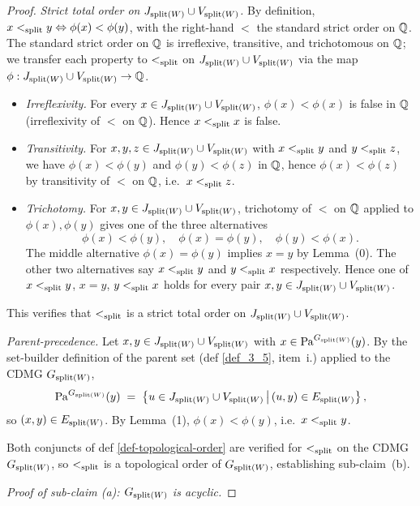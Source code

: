 \documentclass[main]{subfiles}
\begin{document}
\begin{proof}
\emph{Strict total order on $J_{\mathrm{split}(W)} \cup V_{\mathrm{split}(W)}$.} By definition, $x <_{\mathrm{split}} y \Leftrightarrow \phi(x) < \phi(y)$, with the right-hand $<$ the standard strict order on $\mathbb{Q}$. The standard strict order on $\mathbb{Q}$ is irreflexive, transitive, and trichotomous on $\mathbb{Q}$; we transfer each property to $<_{\mathrm{split}}$ on $J_{\mathrm{split}(W)} \cup V_{\mathrm{split}(W)}$ via the map $\phi : J_{\mathrm{split}(W)} \cup V_{\mathrm{split}(W)} \to \mathbb{Q}$.
\begin{itemize}
    \item \emph{Irreflexivity.} For every $x \in J_{\mathrm{split}(W)} \cup V_{\mathrm{split}(W)}$, $\phi(x) < \phi(x)$ is false in $\mathbb{Q}$ (irreflexivity of $<$ on $\mathbb{Q}$). Hence $x <_{\mathrm{split}} x$ is false.
    \item \emph{Transitivity.} For $x, y, z \in J_{\mathrm{split}(W)} \cup V_{\mathrm{split}(W)}$ with $x <_{\mathrm{split}} y$ and $y <_{\mathrm{split}} z$, we have $\phi(x) < \phi(y)$ and $\phi(y) < \phi(z)$ in $\mathbb{Q}$, hence $\phi(x) < \phi(z)$ by transitivity of $<$ on $\mathbb{Q}$, i.e.\ $x <_{\mathrm{split}} z$.
    \item \emph{Trichotomy.} For $x, y \in J_{\mathrm{split}(W)} \cup V_{\mathrm{split}(W)}$, trichotomy of $<$ on $\mathbb{Q}$ applied to $\phi(x), \phi(y)$ gives one of the three alternatives
        \[
            \phi(x) < \phi(y), \quad \phi(x) = \phi(y), \quad \phi(y) < \phi(x).
        \]
        The middle alternative $\phi(x) = \phi(y)$ implies $x = y$ by Lemma~(0). The other two alternatives say $x <_{\mathrm{split}} y$ and $y <_{\mathrm{split}} x$ respectively. Hence one of $x <_{\mathrm{split}} y$, $x = y$, $y <_{\mathrm{split}} x$ holds for every pair $x, y \in J_{\mathrm{split}(W)} \cup V_{\mathrm{split}(W)}$.
\end{itemize}
This verifies that $<_{\mathrm{split}}$ is a strict total order on $J_{\mathrm{split}(W)} \cup V_{\mathrm{split}(W)}$.

\emph{Parent-precedence.} Let $x, y \in J_{\mathrm{split}(W)} \cup V_{\mathrm{split}(W)}$ with $x \in \mathrm{Pa}^{G_{\mathrm{split}(W)}}(y)$. By the set-builder definition of the parent set (def \ref{def_3_5}, item~i.) applied to the CDMG $G_{\mathrm{split}(W)}$,
\[
    \mathrm{Pa}^{G_{\mathrm{split}(W)}}(y) \;=\; \left \{ u \in J_{\mathrm{split}(W)} \cup V_{\mathrm{split}(W)} \,\big|\, (u, y) \in E_{\mathrm{split}(W)} \right \},
\]
so $(x, y) \in E_{\mathrm{split}(W)}$. By Lemma~(1), $\phi(x) < \phi(y)$, i.e.\ $x <_{\mathrm{split}} y$.

Both conjuncts of def \ref{def-topological-order} are verified for $<_{\mathrm{split}}$ on the CDMG $G_{\mathrm{split}(W)}$, so $<_{\mathrm{split}}$ is a topological order of $G_{\mathrm{split}(W)}$, establishing sub-claim~(b).

\medskip\noindent\emph{Proof of sub-claim (a): $G_{\mathrm{split}(W)}$ is acyclic.}


\end{proof}
\end{document}

